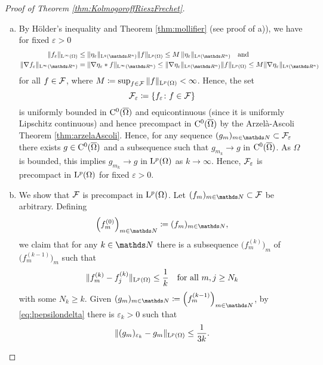 \begin{proof}[Proof of Theorem \ref{thm:KolmogoroffRieszFrechet}]
\begin{enumerate}[I)]
\begin{enumerate}[a)]
      \item By Hölder's inequality and Theorem \ref{thm:mollifier} (see proof of a)), we have for fixed $\varepsilon > 0$
         \begin{align*}
           \| f_\varepsilon\|_{\Ell^\infty(\Omega)}
           &\leq \|\eta_\varepsilon \|_{\Ell^q(\R^n)} \|f\|_{\Ell^p(\Omega)}
           \leq M \, \|\eta_\varepsilon \|_{\Ell^q(\R^n)} \quad\text{and} \\
           \|\nabla f_\varepsilon \|_{\Ell^\infty(\R^n)}
           &= \| \nabla \eta_\varepsilon \ast f \|_{\Ell^\infty(\R^n)}
           \leq \| \nabla \eta_\varepsilon \|_{\Ell^q(\R^n)} \|f\|_{\Ell^p(\Omega)}
           \leq M \|\nabla \eta_\varepsilon \|_{\Ell^q(\R^n)} 
         \end{align*}
         for all $f \in \mathcal{F}$, where $M \coloneqq \sup_{f \in \mathcal{F}} \| f\|_{\mathrm{L}^p(\Omega)} < \infty$.
         Hence, the set $$\mathcal{F}_\varepsilon \coloneqq \{ f_\varepsilon \colon f \in \mathcal{F} \}$$ is uniformly bounded in $\mathrm{C}^0(\overline\Omega)$ and equicontinuous (since it is uniformly Lipschitz continuous) and hence precompact in $\mathrm{C}^0(\overline\Omega)$ by the Arzel\`a-Ascoli Theorem \ref{thm:arzelaAscoli}.
        Hence, for any sequence $(g_m)_{m \in \N} \subset \FF_\varepsilon$ there exists $g \in \mathrm{C}^0(\overline\Omega)$ and a subsequence such that $g_{m_k} \to g$ in $\mathrm{C}^0(\overline\Omega)$.
        As $\Omega$ is bounded, this implies $g_{m_k} \to g$ in $\mathrm{L}^p(\Omega)$ as $k \to \infty$.
        Hence, $\mathcal{F}_\varepsilon$ is precompact in $\mathrm{L}^p(\Omega)$ for fixed $\varepsilon > 0$.
      \item 
        We show that $\mathcal{F}$ is precompact in $\mathrm{L}^p(\Omega)$.
        Let $(f_m)_{m \in \N} \subset \FF$ be arbitrary.
        Defining $$\Big(f_m^{(0)}\Big)_{m \in \N} \coloneqq (f_m)_{m \in \N},$$ we claim that for any $k \in \N$ there is a subsequence $\Big(f_m^{(k)}\Big)_m$ of $\Big(f_m^{(k - 1)}\Big)_m$ such that
        \begin{equation}
          \label{eq:lpcauchy}
          \|f_m^{(k)} - f_j^{(k)} \|_{\mathrm{L}^p(\Omega)} \leq \frac{1}{k} \quad\text{for all } m,j \geq N_k
        \end{equation}
        with some $N_k \geq k$.
        Given $(g_m)_{m \in \N} \coloneqq \Big( f_m^{(k- 1)}\Big)_{m \in \N}$, by \eqref{eq:lpepsilondelta} there is $\varepsilon_k > 0$ such that
        \begin{equation}
          \label{eq:cauchyMollifier}
          \|(g_m)_{\varepsilon_k} - g_m\|_{\Ell^p(\Omega)} \leq \frac{1}{3k}.

\end{equation}
\end{enumerate}
\end{enumerate}
\end{proof}
